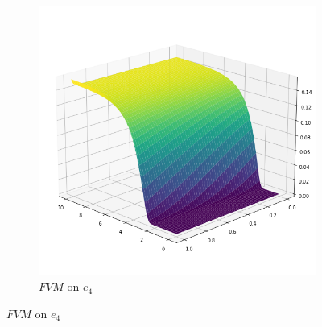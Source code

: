 \begin{figure}[H]
\begin{center}
\begin{subfigure}[b]{0.4\textwidth}
\begin{center}
                \includegraphics[scale=0.35]{img/FVM4.png}
            \end{center}
            \caption{$FVM$ on $e_4$}
        \end{subfigure}
    \end{center}
\end{figure}
